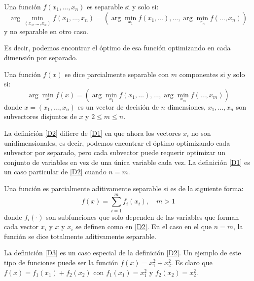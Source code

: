 \begin{definicion}
\label{D1}
Una función \( f(x_1, \ldots, x_n) \) es separable si y solo si:
\begin{equation}
\arg \min_{(x_1, \ldots, x_n)} f(x_1, \ldots, x_n) =
\left(
\arg \min_{x_1} f(x_1, \ldots), \ldots, \arg \min_{x_n} f(\ldots, x_n)
\right)
\label{EQ1}
\end{equation}
y no separable en otro caso.
\end{definicion}

Es decir, podemos encontrar el óptimo de esa función optimizando en cada dimensión por separado.

\begin{definicion}
\label{D2}
Una función \(f(x)\) se dice parcialmente separable con \( m \) componentes si y solo si:
\begin{equation}
\arg \min_{x} f(x) =
\left(
\arg \min_{x_1} f(x_1, \ldots), \ldots, \arg \min_{x_m} f(\ldots, x_m)
\right)
\label{EQ2}
\end{equation}
donde \( x = (x_1, \ldots, x_n) \) es un vector de decisión de \( n \) dimensiones, \( x_1, \ldots, x_n \) son subvectores disjuntos de \( x \) y \( 2 \leq m \leq n \).

La definición \ref{D2} difiere de \ref{D1} en que ahora los vectores \( x_i \) no son unidimensionales, es decir, podemos encontrar el óptimo optimizando cada subvector por separado, pero cada subvector puede requerir optimizar un conjunto de variables en vez de una única variable cada vez. La definición \ref{D1} es un caso particular de \ref{D2} cuando \( n = m \).
\end{definicion}

\begin{definicion}
\label{D3}
Una función es parcialmente aditivamente separable si es de la siguiente forma:
\begin{equation}
f(x) = \sum_{i=1}^{m} f_i(x_i), \quad m > 1
\label{EQ3}
\end{equation}
donde \( f_i(\cdot) \) son subfunciones que solo dependen de las variables que forman cada vector \( x_i \) y \( x \) y \( x_i \) se definen como en \ref{D2}. En el caso en el que \( n = m \), la función se dice totalmente aditivamente separable.
\end{definicion}

La definición \ref{D3} es un caso especial de la definición \ref{D2}. Un ejemplo de este tipo de funciones puede ser la función \( f(x) = x_1^2 + x_2^2 \). Es claro que \( f(x) = f_1(x_1) + f_2(x_2) \) con \( f_1(x_1) = x_1^2 \) y \( f_2(x_2) = x_2^2 \).

